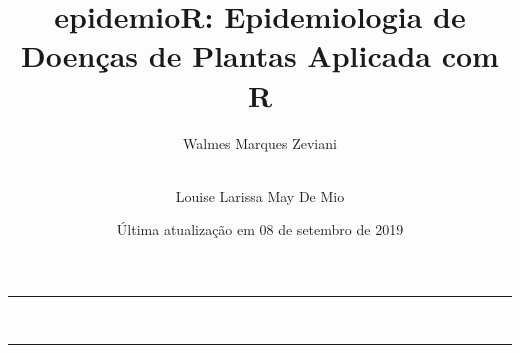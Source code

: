 \documentclass[a4paper,]{book}
\title{epidemioR: Epidemiologia de Doenças de Plantas Aplicada com R}
\author{
      Walmes Marques Zeviani
     \and\\
      Louise Larissa May De Mio
    }
\date{Última atualização em 08 de setembro de 2019}
\begin{document}



\begin{titlepage}
\thispagestyle{empty}
\centering

\vspace*{\fill}


\noindent\rule{\textwidth}{0.2mm}


{\Large \textbf{\thetitle}}\\


\noindent\rule{\textwidth}{0.2mm}
\vspace{0.5cm}

\thedate
\vspace{1.5cm}

\theauthor

\vspace*{\fill}
\end{titlepage}

\thispagestyle{empty}
\cleardoublepage


\thispagestyle{empty}
\cleardoublepage
\thispagestyle{empty}


\begin{flushleft}
{\Large \textbf{\thetitle}}\\

\end{flushleft}
\vspace*{1.5em}
\end{document}
